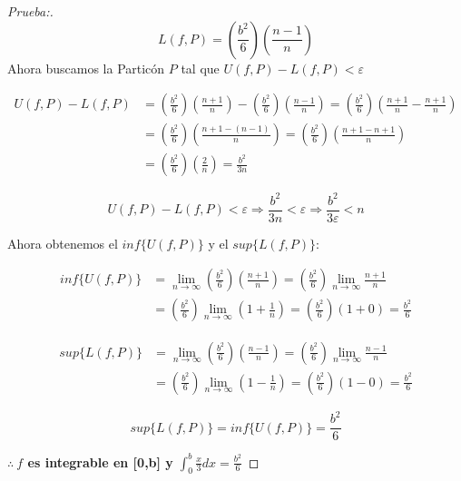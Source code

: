 \documentclass[12pt]{article}
\begin{document}
\begin{enumerate}[\hspace{9px} a)]
\begin{proof}[Prueba:]
            \[L(f,P)=\left(\frac{b^2}{6}\right)\left(\frac{n-1}{n}\right)\]
            Ahora buscamos la Partic\'on $P$ tal que \(U(f,P)-L(f,P)<\varepsilon\)

            \begin{align*}
                U(f,P)-L(f,P) &= \left(\frac{b^2}{6}\right)\left(\frac{n+1}{n}\right)-\left(\frac{b^2}{6}\right)\left(\frac{n-1}{n}\right) = \left(\frac{b^2}{6}\right)\left(\frac{n+1}{n}-\frac{n+1}{n}\right) \\
                &= \left(\frac{b^2}{6}\right)\left(\frac{n+1-(n-1)}{n}\right) = \left(\frac{b^2}{6}\right)\left(\frac{n+1-n+1}{n}\right) \\
                &= \left(\frac{b^2}{6}\right)\left(\frac{2}{n}\right) = \frac{b^2}{3n}
            \end{align*}

            \begin{equation*}
                U(f,P)-L(f,P)<\varepsilon \Longrightarrow \frac{b^2}{3n}<\varepsilon \Longrightarrow \frac{b^2}{3\varepsilon}<n
            \end{equation*}\medskip

            Ahora obtenemos el \(inf\{U(f,P)\}\) y el \(sup\{L(f,P)\}\):

            \begin{align*}
                inf\{U(f,P)\} &= \lim_{n \to \infty}\left(\frac{b^2}{6}\right)\left(\frac{n+1}{n}\right) = \left(\frac{b^2}{6}\right)\lim_{n \to \infty}\frac{n+1}{n} \\
                &= \left(\frac{b^2}{6}\right)\lim_{n \to \infty}\left(1+\frac{1}{n}\right) = \left(\frac{b^2}{6}\right)(1+0) = \frac{b^2}{6}
            \end{align*}

            \begin{align*}
                sup\{L(f,P)\} &= \lim_{n \to \infty}\left(\frac{b^2}{6}\right)\left(\frac{n-1}{n}\right) = \left(\frac{b^2}{6}\right)\lim_{n \to \infty}\frac{n-1}{n} \\
                &= \left(\frac{b^2}{6}\right)\lim_{n \to \infty}\left(1-\frac{1}{n}\right) = \left(\frac{b^2}{6}\right)(1-0) = \frac{b^2}{6}
            \end{align*}

            \[sup\{L(f,P)\}=inf\{U(f,P)\}=\frac{b^2}{6}\]

            \textbf{$\therefore \ f$ es integrable en [0,b] y} \(\displaystyle\int_{0}^{b}\frac{x}{3}dx=\frac{b^2}{6}\)
        \end{proof}


\end{enumerate}
\end{document}

